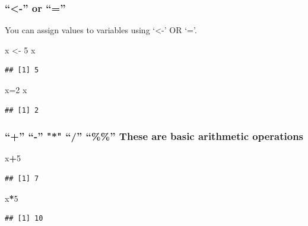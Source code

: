 \documentclass[]{article}
\newenvironment{Shaded}{\begin{snugshade}}{\end{snugshade}}
\newcommand{\DecValTok}[1]{\textcolor[rgb]{0.00,0.00,0.81}{#1}}
\newcommand{\NormalTok}[1]{#1}
\newcommand{\OperatorTok}[1]{\textcolor[rgb]{0.81,0.36,0.00}{\textbf{#1}}}
\newcommand{\StringTok}[1]{\textcolor[rgb]{0.31,0.60,0.02}{#1}}
\begin{document}
\hypertarget{or}{%
\subsubsection{``\textless{}-'' or ``=''}\label{or}}

You can assign values to variables using `\textless{}-' OR `='.

\begin{Shaded}
\begin{Highlighting}[]
\NormalTok{x <-}\StringTok{ }\DecValTok{5}
\NormalTok{x}
\end{Highlighting}
\end{Shaded}

\begin{verbatim}
## [1] 5
\end{verbatim}

\begin{Shaded}
\begin{Highlighting}[]
\NormalTok{x=}\DecValTok{2}
\NormalTok{x}
\end{Highlighting}
\end{Shaded}

\begin{verbatim}
## [1] 2
\end{verbatim}

\hypertarget{these-are-basic-arithmetic-operations}{%
\subsubsection{``+'' ``-'' "*" ``/'' ``\%\%'' These are basic arithmetic
operations}\label{these-are-basic-arithmetic-operations}}

\begin{Shaded}
\begin{Highlighting}[]
\NormalTok{x}\OperatorTok{+}\DecValTok{5}
\end{Highlighting}
\end{Shaded}

\begin{verbatim}
## [1] 7
\end{verbatim}

\begin{Shaded}
\begin{Highlighting}[]
\NormalTok{x}\OperatorTok{*}\DecValTok{5}
\end{Highlighting}
\end{Shaded}

\begin{verbatim}
## [1] 10
\end{verbatim}
\end{document}

